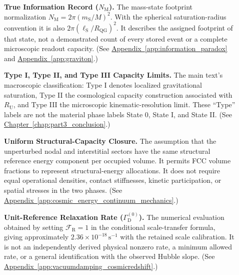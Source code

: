 \begin{description}
\item[] \begin{minipage}[t]{\linewidth}
\textbf{True Information Record ($N_{\mathrm M}$).} The mass-state footprint normalization $N_{\mathrm M}=2\pi(m_{\mathrm S}/M)^2$. With the spherical saturation-radius convention it is also $2\pi(\ell_{\mathrm S}/R_{\mathrm{QG}})^2$. It describes the assigned footprint of that state, not a demonstrated count of every stored event or a complete microscopic readout capacity.
(See \hyperref[app:information_paradox]{Appendix~\ref*{app:information_paradox}} and \hyperref[app:graviton]{Appendix~\ref*{app:graviton}}.)
\end{minipage}

\item[] \begin{minipage}[t]{\linewidth}
\textbf{Type I, Type II, and Type III Capacity Limits.} The main text's macroscopic classification: Type I denotes localized gravitational saturation, Type II the cosmological capacity construction associated with $R_{\mathrm U}$, and Type III the microscopic kinematic-resolution limit. These ``Type'' labels are not the material phase labels State 0, State I, and State II.
(See \hyperref[chap:part3_conclusion]{Chapter~\ref*{chap:part3_conclusion}}.)
\end{minipage}

\item[] \begin{minipage}[t]{\linewidth}
\textbf{Uniform Structural-Capacity Closure.} The assumption that the unperturbed nodal and interstitial sectors have the same structural reference energy component per occupied volume. It permits FCC volume fractions to represent structural-energy allocations. It does not require equal operational densities, contact stiffnesses, kinetic participation, or spatial stresses in the two phases.
(See \hyperref[app:cosmic_energy_continuum_mechanics]{Appendix~\ref*{app:cosmic_energy_continuum_mechanics}}.)
\end{minipage}

\item[] \begin{minipage}[t]{\linewidth}
\textbf{Unit-Reference Relaxation Rate ($\Gamma_{\mathrm D}^{(0)}$).} The numerical evaluation obtained by setting $\mathcal F_{\mathrm R}=1$ in the conditional scale-transfer formula, giving approximately $2.36\times10^{-18}\,\mathrm{s^{-1}}$ with the retained scale calibration. It is not an independently derived physical nonzero rate, a minimum allowed rate, or a general identification with the observed Hubble slope.
(See \hyperref[app:vacuumdamping_cosmicredshift]{Appendix~\ref*{app:vacuumdamping_cosmicredshift}}.)
\end{minipage}


\end{description}
